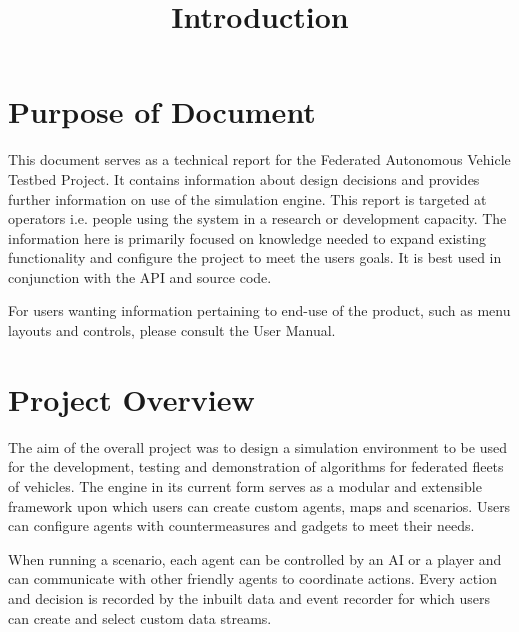\documentclass[../main.tex]{subfiles}
\title{Introduction}
\begin{document}
\section{Purpose of Document}
This document serves as a technical report for the Federated Autonomous Vehicle Testbed Project. It contains information about design decisions and provides further information on use of the simulation engine. This report is targeted at operators i.e. people using the system in a research or development capacity. The information here is primarily focused on knowledge needed to expand existing functionality and configure the project to meet the users goals. It is best used in conjunction with the API and source code.

For users wanting information pertaining to end-use of the product, such as menu layouts and controls, please consult the User Manual.

\section{Project Overview}
The aim of the overall project was to design a simulation environment to be used for the development, testing and demonstration of algorithms for federated fleets of vehicles. The engine in its current form serves as a modular and extensible framework upon which users can create custom agents, maps and scenarios. Users can configure agents with countermeasures and gadgets to meet their needs. 

When running a scenario, each agent can be controlled by an AI or a player and can communicate with other friendly agents to coordinate actions. Every action and decision is recorded by the inbuilt data and event recorder for which users can create and select custom data streams.
\end{document}
